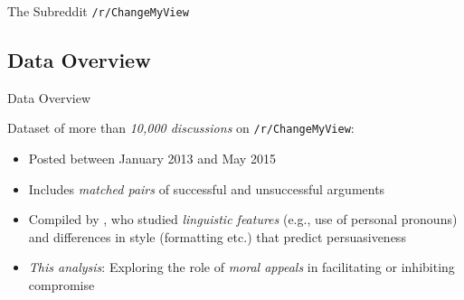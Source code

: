 \documentclass{beamer}
\begin{document}
\begin{frame}{The Subreddit \texttt{/r/ChangeMyView}}
\begin{figure}
\end{figure}
\end{frame}

\subsection{Data Overview}
\begin{frame}{Data Overview}

Dataset of more than \emph{10,000 discussions} on \texttt{/r/ChangeMyView}: 
\begin{itemize}
	\item Posted between January 2013 and May 2015
	\item Includes \emph{matched pairs} of successful and unsuccessful arguments
	\item Compiled by \citet{tan2016winning}, who studied \emph{linguistic features} (e.g., use of personal pronouns) and differences in style (formatting etc.) that predict persuasiveness
	\vspace{1em}
	\item \emph{This analysis}: Exploring the role of \emph{moral appeals} in facilitating or inhibiting compromise
\end{itemize}
\end{frame}
\end{document}
